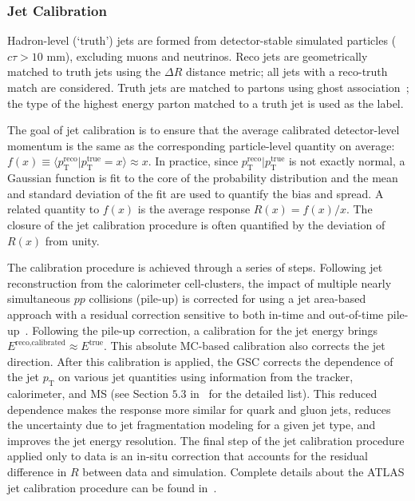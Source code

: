 \subsubsection{Jet Calibration}
\label{sec:ATLAS:jet_calibration}
Hadron-level (`truth') jets are formed from detector-stable simulated particles ($c\tau > 10$ mm), excluding muons and neutrinos.  Reco jets are geometrically matched to truth jets using the $\Delta R$ distance metric; all jets with a reco-truth match are considered.  Truth jets are matched to partons using ghost association~\cite{Cacciari:2008gn}; the type of the highest energy parton matched to a truth jet is used as the label. 

The goal of jet calibration is to ensure that the average calibrated detector-level momentum is the same as the corresponding particle-level quantity on average: $f(x)\equiv\langle p_\text{T}^\text{reco}|p_\text{T}^\text{true}=x\rangle\approx x$.  In practice, since $p_\text{T}^\text{reco}|p_\text{T}^\text{true}$ is not exactly normal, a Gaussian function is fit to the core of the probability distribution and the mean and standard deviation of the fit are used to quantify the bias and spread.  A related quantity to $f(x)$ is the average response $R(x)=f(x)/x$.  The closure of the jet calibration procedure is often quantified by the deviation of $R(x)$ from unity.

The calibration procedure is achieved through a series of steps.
Following jet reconstruction from the calorimeter cell-clusters, the impact of multiple nearly simultaneous $pp$ collisions (pile-up) is corrected for using a jet area-based~\cite{Cacciari:2007fd,Cacciari:2008gn} approach with a residual correction sensitive to both in-time and out-of-time pile-up~\cite{Aad:2015ina}.
Following the pile-up correction, a calibration for the jet energy brings $E^\text{reco,calibrated}\approx E^\text{true}$.
This absolute MC-based calibration also corrects the jet direction.
After this calibration is applied, the GSC corrects the dependence of the jet $p_\text{T}$ on various jet quantities using information from the tracker, calorimeter, and MS (see Section $5.3$ in~\cite{PERF-2016-04} for the detailed list).
This reduced dependence makes the response more similar for quark and gluon jets, reduces the uncertainty due to jet fragmentation modeling for a given jet type, and improves the jet energy resolution.
The final step of the jet calibration procedure applied only to data is an in-situ correction that accounts for the residual difference in $R$ between data and simulation.
Complete details about the ATLAS jet calibration procedure can be found in~\cite{PERF-2016-04,Aad:2011he}.  

